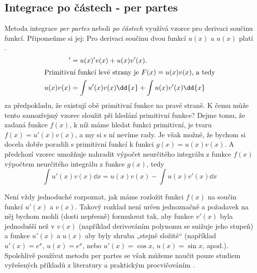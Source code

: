     \subsection{Integrace po částech - per partes}
      Metoda integrace \emph{per partes} neboli \emph{po částech} využívá vzorce pro derivaci 
      součinu funkcí. Připomeňme si jej: Pro derivaci součinu dvou funkcí \(u(x)\) a \(u(x)\) platí
      \cite[p.~137]{Musilova2009MA1}.
      \begin{align}
        [u(x)v(x)]' &= u(x)'v(x) + u(x)v'(x).  \label{MA:eq_Int29} \\
        \shortintertext{Primitivní funkcí levé strany je \(F(x) = u(x)v(x)\), a tedy}
        u(x)v(x)    &=  \int u'(x)v(x)\dd{x} + \int u(x)v'(x)\dd{x} \nonumber
      \end{align}  
      za předpokladu, že existují obě primitivní funkce na pravé straně. K čemu může tento
      samozřejmý vzorec sloužit při hledání primitivní funkce? Dejme tomu, že zadaná funkce
      \(f(x)\), k níž máme hledat funkci primitivní, je tvaru \(f(x) = u'(x)v(x)\), a my si s ní
      nevíme rady. Je však možné, že bychom si docela dobře poradili s primitivní funkcí k funkci
      \(g(x) = u(x)v(x)\). A předchozí vzorec umožňuje nahradit výpočet neurčitého integrálu z
      funkce \(f(x)\) výpočtem neurčitého integrálu z funkce \(g(x)\), tedy
      \begin{equation}\label{ma:eq_perpartes}
        \int u'(x)v(x)\dd{x} = u(x)v(x) - \int u(x)v'(x)\dd{x} 
      \end{equation}

      

      Není vždy jednoduché rozpoznat, jak máme rozložit funkci \(f(x)\) na součin funkcí \(u'(x)\) 
      a \(v(x)\). Takový rozklad není určen jednoznačně a požadavek na něj bychom mohli (dosti 
      nepřesně) formulovat tak, aby funkce \(v'(x)\) byla jednodušší než v \(v(x)\) (například 
      derivováním polynomu se snižuje jeho stupeň) a funkce \(u'(x)\) a \(u(x)\) aby byly zhruba 
      „stejně složité“ (například \(u'(x) =e^x\), \(u(x) = e^x\), nebo \(u'(x) = \cos x\), \(u(x) = 
      \sin x\), apod.). Spolehlivě používat metodu per partes se však můžeme naučit pouze studiem 
      vyřešených příkladů z literatury a praktickým procvičováním \cite[p.~138]{Musilova2009MA1}.
  
